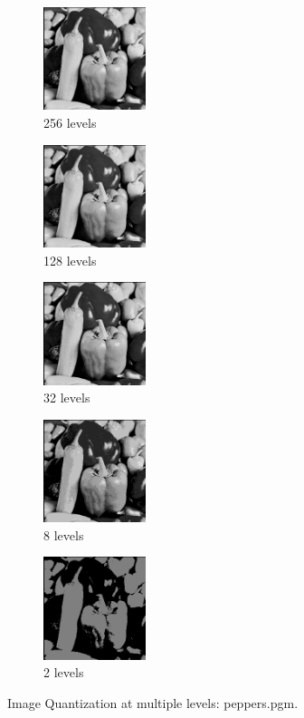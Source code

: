 \documentclass[letterpaper,10pt]{article}
\begin{document}
\begin{figure}[hbtp]
  \centering
  \begin{subfigure}{3cm}
    \includegraphics[width=3cm]{images/peppers.png}
    \caption{256 levels}
  \end{subfigure}
  \begin{subfigure}{3cm}
    \includegraphics[width=3cm]{images/peppers_quantization128.png}
    \caption{128 levels}
  \end{subfigure}
  \begin{subfigure}{3cm}
    \includegraphics[width=3cm]{images/peppers_quantization32.png}
    \caption{32 levels}
  \end{subfigure}
  \begin{subfigure}{3cm}
    \includegraphics[width=3cm]{images/peppers_quantization8.png}
    \caption{8 levels}
  \end{subfigure}
  \begin{subfigure}{3cm}
    \includegraphics[width=3cm]{images/peppers_quantization2.png}
    \caption{2 levels}
  \end{subfigure}
  \caption{Image Quantization at multiple levels: peppers.pgm.}
  \label{fig:quantlenna}
\end{figure}
\end{document}
